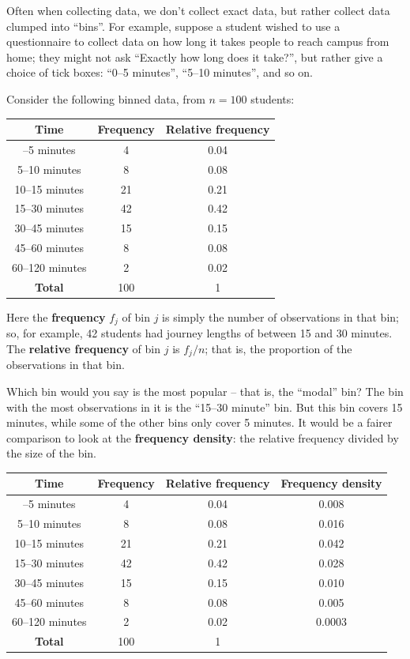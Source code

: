 \documentclass[
  a4paper,
]{book}
\theoremstyle{definition}
\theoremstyle{definition}
\theoremstyle{definition}
\theoremstyle{definition}
\theoremstyle{remark}
\begin{document}
Often when collecting data, we don't collect exact data, but rather collect data clumped into ``bins''. For example, suppose a student wished to use a questionnaire to collect data on how long it takes people to reach campus from home; they might not ask ``Exactly how long does it take?'', but rather give a choice of tick boxes: ``0--5 minutes'', ``5--10 minutes'', and so on.

Consider the following binned data, from \(n = 100\) students:

\begin{longtable}[]{@{}ccc@{}}
\toprule\noalign{}
Time & Frequency & Relative frequency \\
\midrule\noalign{}
\endhead
\bottomrule\noalign{}
\endlastfoot
0--5 minutes & 4 & 0.04 \\
5--10 minutes & 8 & 0.08 \\
10--15 minutes & 21 & 0.21 \\
15--30 minutes & 42 & 0.42 \\
30--45 minutes & 15 & 0.15 \\
45--60 minutes & 8 & 0.08 \\
60--120 minutes & 2 & 0.02 \\
\textbf{Total} & 100 & 1 \\
\end{longtable}

Here the \textbf{frequency} \(f_j\) of bin \(j\) is simply the number of observations in that bin; so, for example, 42 students had journey lengths of between 15 and 30 minutes. The \textbf{relative frequency} of bin \(j\) is \(f_j/n\); that is, the proportion of the observations in that bin.

Which bin would you say is the most popular -- that is, the ``modal'' bin? The bin with the most observations in it is the ``15--30 minute'' bin. But this bin covers 15 minutes, while some of the other bins only cover 5 minutes. It would be a fairer comparison to look at the \textbf{frequency density}: the relative frequency divided by the size of the bin.

\begin{longtable}[]{@{}cccc@{}}
\toprule\noalign{}
Time & Frequency & Relative frequency & Frequency density \\
\midrule\noalign{}
\endhead
\bottomrule\noalign{}
\endlastfoot
0--5 minutes & 4 & 0.04 & 0.008 \\
5--10 minutes & 8 & 0.08 & 0.016 \\
10--15 minutes & 21 & 0.21 & 0.042 \\
15--30 minutes & 42 & 0.42 & 0.028 \\
30--45 minutes & 15 & 0.15 & 0.010 \\
45--60 minutes & 8 & 0.08 & 0.005 \\
60--120 minutes & 2 & 0.02 & 0.0003 \\
\textbf{Total} & 100 & 1 & \\
\end{longtable}
\end{document}
